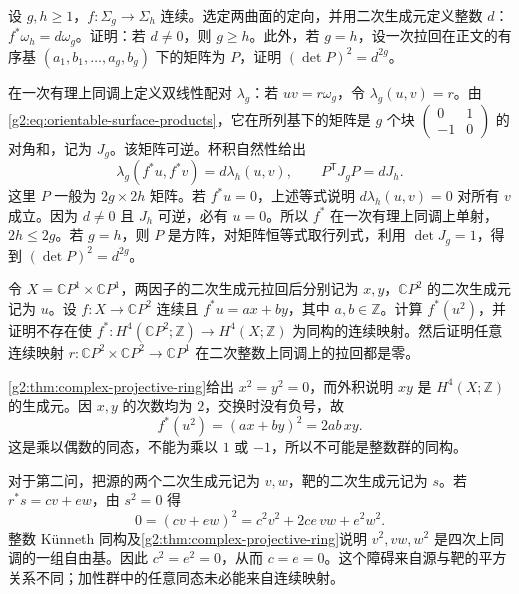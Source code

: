 \begin{exercise}\label{g2:ex:surface-ring-genus-bound}
	设 \(g,h\geq1\)，\(f:\Sigma_g\to\Sigma_h\) 连续。选定两曲面的定向，并用二次生成元定义整数 \(d\)：\(f^*\omega_h=d\omega_g\)。证明：若 \(d\ne0\)，则 \(g\geq h\)。此外，若 \(g=h\)，设一次拉回在正文的有序基 \((a_1,b_1,\ldots,a_g,b_g)\) 下的矩阵为 \(P\)，证明 \((\det P)^2=d^{2g}\)。
\end{exercise}
\begin{solution}
	在一次有理上同调上定义双线性配对 \(\lambda_g\)：若 \(uv=r\omega_g\)，令 \(\lambda_g(u,v)=r\)。由\eqref{g2:eq:orientable-surface-products}，它在所列基下的矩阵是 \(g\) 个块 \(\left(\begin{smallmatrix}0&1\\-1&0\end{smallmatrix}\right)\) 的对角和，记为 \(J_g\)。该矩阵可逆。杯积自然性给出
	\[
		\lambda_g(f^*u,f^*v)=d\lambda_h(u,v),\qquad P^{\mathsf T}J_gP=dJ_h.
	\]
	这里 \(P\) 一般为 \(2g\times2h\) 矩阵。若 \(f^*u=0\)，上述等式说明 \(d\lambda_h(u,v)=0\) 对所有 \(v\) 成立。因为 \(d\ne0\) 且 \(J_h\) 可逆，必有 \(u=0\)。所以 \(f^*\) 在一次有理上同调上单射，\(2h\leq2g\)。若 \(g=h\)，则 \(P\) 是方阵，对矩阵恒等式取行列式，利用 \(\det J_g=1\)，得到 \((\det P)^2=d^{2g}\)。
\end{solution}

\begin{exercise}\label{g2:ex:projective-product-even-degree}
	令 \(X=\mathbb CP^1\times\mathbb CP^1\)，两因子的二次生成元拉回后分别记为 \(x,y\)，\(\mathbb CP^2\) 的二次生成元记为 \(u\)。设 \(f:X\to\mathbb CP^2\) 连续且 \(f^*u=ax+by\)，其中 \(a,b\in\mathbb Z\)。计算 \(f^*(u^2)\)，并证明不存在使 \(f^*:H^4(\mathbb CP^2;\mathbb Z)\to H^4(X;\mathbb Z)\) 为同构的连续映射。然后证明任意连续映射 \(r:\mathbb CP^2\times\mathbb CP^2\to\mathbb CP^1\) 在二次整数上同调上的拉回都是零。
\end{exercise}
\begin{solution}
	\cref{g2:thm:complex-projective-ring}给出 \(x^2=y^2=0\)，而外积说明 \(xy\) 是 \(H^4(X;\mathbb Z)\) 的生成元。因 \(x,y\) 的次数均为 \(2\)，交换时没有负号，故
	\[
		f^*(u^2)=(ax+by)^2=2ab\,xy.
	\]
	这是乘以偶数的同态，不能为乘以 \(1\) 或 \(-1\)，所以不可能是整数群的同构。

	对于第二问，把源的两个二次生成元记为 \(v,w\)，靶的二次生成元记为 \(s\)。若 \(r^*s=cv+ew\)，由 \(s^2=0\) 得
	\[
		0=(cv+ew)^2=c^2v^2+2ce\,vw+e^2w^2.
	\]
	整数 Künneth 同构及\cref{g2:thm:complex-projective-ring}说明 \(v^2,vw,w^2\) 是四次上同调的一组自由基。因此 \(c^2=e^2=0\)，从而 \(c=e=0\)。这个障碍来自源与靶的平方关系不同；加性群中的任意同态未必能来自连续映射。
\end{solution}

